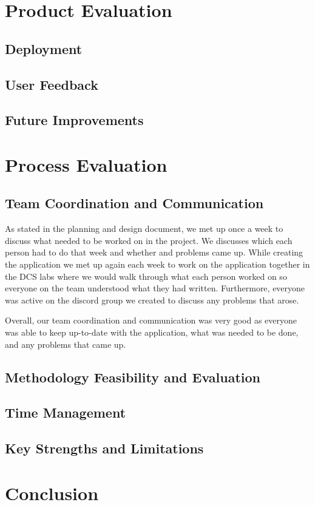 \documentclass{article}
\begin{document}
\section{Product Evaluation}

    \subsection{Deployment}

    \subsection{User Feedback}

    \subsection{Future Improvements}

\section{Process Evaluation}

    \subsection{Team Coordination and Communication}
    As stated in the planning and design document, we met up once a week to discuss what needed to be worked on in the project. We discusses which each person had to do that week and whether and problems came up. While creating the application we met up again each week to work on the application together in the DCS labs where we would walk through what each person worked on so everyone on the team understood what they had written. Furthermore, everyone was active on the discord group we created to discuss any problems that arose.

    Overall, our team coordination and communication was very good as everyone was able to keep up-to-date with the application, what was needed to be done, and any problems that came up.

    \subsection{Methodology Feasibility and Evaluation}

    \subsection{Time Management}

    \subsection{Key Strengths and Limitations}

\section{Conclusion}
\end{document}
